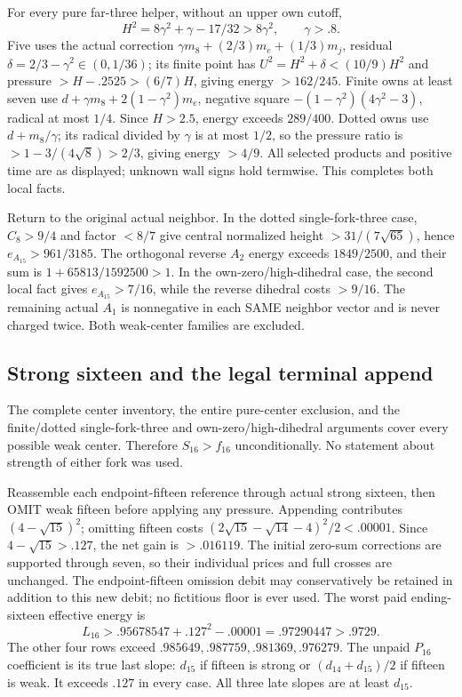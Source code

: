 \documentclass[11pt]{article}
\theoremstyle{definition}
\theoremstyle{remark}
\begin{document}
For every pure far-three helper, without an upper own cutoff,
\[
 H^2=8\gamma^2+\gamma-17/32>8\gamma^2,\qquad \gamma>.8 .
\]
Five uses the actual correction
\(\gamma m_8+(2/3)m_e+(1/3)m_j\), residual
\(\delta=2/3-\gamma^2\in(0,1/36)\);
its finite point has \(U^2=H^2+\delta<(10/9)H^2\)
and pressure \(>H-.2525>(6/7)H\), giving energy \(>162/245\).
Finite owns at least seven use
\(d+\gamma m_8+2(1-\gamma^2)m_e\), negative square
\(-(1-\gamma^2)(4\gamma^2-3)\), radical at most \(1/4\).
Since \(H>2.5\), energy exceeds \(289/400\).
Dotted owns use \(d+m_8/\gamma\); its radical divided by
\(\gamma\) is at most \(1/2\), so the pressure ratio is
\(>1-3/(4\sqrt8)>2/3\), giving energy \(>4/9\).
All selected products and positive time are as displayed;
unknown wall signs hold termwise. This completes both local facts.

Return to the original actual neighbor.
In the dotted single-fork-three case, \(C_8>9/4\) and factor
\(<8/7\) give central normalized height
\(>31/(7\sqrt{65})\), hence \(e_{A_{15}}>961/3185\).
The orthogonal reverse \(A_2\) energy exceeds \(1849/2500\),
and their sum is
\(1+65813/1592500>1\).
In the own-zero/high-dihedral case, the second local fact gives
\(e_{A_{15}}>7/16\), while the reverse dihedral costs \(>9/16\).
The remaining actual \(A_1\) is nonnegative in each SAME neighbor
vector and is never charged twice.
Both weak-center families are excluded.

\subsection{Strong sixteen and the legal terminal append}
\label{app:D18strong16}
The complete center inventory, the entire pure-center exclusion,
and the finite/dotted single-fork-three and own-zero/high-dihedral
arguments cover every possible weak center.
Therefore \(S_{16}>f_{16}\) unconditionally.
No statement about strength of either fork was used.

Reassemble each endpoint-fifteen reference through actual strong sixteen,
then OMIT weak fifteen before applying any pressure.
Appending contributes \((4-\sqrt{15})^2\);
omitting fifteen costs
\((2\sqrt{15}-\sqrt{14}-4)^2/2<.00001\).
Since \(4-\sqrt{15}>.127\), the net gain is \(>.016119\).
The initial zero-sum corrections are supported through seven, so
their individual prices and full crosses are unchanged.
The endpoint-fifteen omission debit may conservatively be retained
in addition to this new debit; no fictitious floor is ever used.
The worst paid ending-sixteen effective energy is
\[
 L_{16}>.95678547+.127^2-.00001=.97290447>.9729 .
\]
The other four rows exceed
\(.985649,.987759,.981369,.976279\).
The unpaid \(P_{16}\) coefficient is its true last slope:
\(d_{15}\) if fifteen is strong or \((d_{14}+d_{15})/2\)
if fifteen is weak. It exceeds \(.127\) in every case.
All three late slopes are at least \(d_{15}\).
\end{document}
